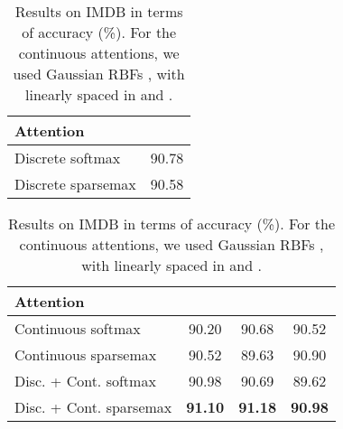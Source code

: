 \documentclass{article}
\begin{document}
\begin{table}[t]
    \caption{Results on IMDB in terms of accuracy (\%). 
    For the continuous attentions, we used  Gaussian RBFs 
, with  linearly spaced in  and . 
} 
    \label{table:results_doc_classification}
    \vspace{-0.1cm}
    \begin{scriptsize}
    \begin{center}
\begin{comment}
\begin{tabular}{lclccclccc}
        \toprule
        \sc Discrete &  & \sc Continuous &  &  &  & \sc Disc. + Cont. &  &  & \\
        \midrule 
        softmax    		& 90.78		& 
        softmax			& 90.20		& 90.68		& 90.52    &
        softmax		& 90.98		& 90.69		& 89.62   	\\
        sparsemax	 		& 90.58		& 
        sparsemax	 	& 90.52		& 89.63		& 90.90   	&
        sparsemax	 	& \bf 91.10		& \bf 91.18		& \bf 90.98    	\\
        \bottomrule
    \end{tabular}
\end{comment}
\begin{tabular}{lc}
        \toprule
        \sc Attention &  \\
        \midrule 
        Discrete softmax    		& 90.78 	\\
        Discrete sparsemax	 		& 90.58 	\\
       \bottomrule
 \end{tabular}
 \qquad
\begin{tabular}{lccc}
        \toprule
        \sc Attention &  &  &  \\
       \midrule
        Continuous softmax			& 90.20		& 90.68		& 90.52    	\\
        Continuous sparsemax	 	& 90.52		& 89.63		& 90.90   	\\
        Disc. + Cont. softmax		& 90.98		& 90.69		& 89.62   	\\
        Disc. + Cont. sparsemax	 	& \bf 91.10		& \bf 91.18		& \bf 90.98    	\\
        \bottomrule
    \end{tabular}
\begin{comment}
\begin{tabular}{lccc}
        \toprule
        \sc Attention &  &  &  \\
        \midrule 
        Discrete softmax    		& 90.78		& 90.78		& 90.78    	\\

\end{comment}
\end{center}
\end{scriptsize}
\end{table}
\end{document}
